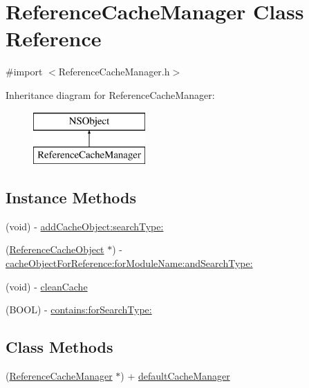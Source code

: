 \hypertarget{interface_reference_cache_manager}{\section{Reference\-Cache\-Manager Class Reference}
\label{interface_reference_cache_manager}
}


{\ttfamily \#import $<$Reference\-Cache\-Manager.\-h$>$}

Inheritance diagram for Reference\-Cache\-Manager\-:\begin{figure}[H]
\begin{center}
\leavevmode
\includegraphics[height=2.000000cm]{interface_reference_cache_manager}
\end{center}
\end{figure}
\subsection*{Instance Methods}
\begin{DoxyCompactItemize}
\item 
(void) -\/ \hyperlink{interface_reference_cache_manager_af47eaefadf41368497a163141b9c8ff6}{add\-Cache\-Object\-:search\-Type\-:}
\item 
(\hyperlink{interface_reference_cache_object}{Reference\-Cache\-Object} $\ast$) -\/ \hyperlink{interface_reference_cache_manager_aa813df3855a6783aa971c9d3444ddddc}{cache\-Object\-For\-Reference\-:for\-Module\-Name\-:and\-Search\-Type\-:}
\item 
(void) -\/ \hyperlink{interface_reference_cache_manager_a655828f5e0358af7462394eaa8be2fdd}{clean\-Cache}
\item 
(B\-O\-O\-L) -\/ \hyperlink{interface_reference_cache_manager_afa5ea945a1806464a933e165d4ce7b4f}{contains\-:for\-Search\-Type\-:}
\end{DoxyCompactItemize}
\subsection*{Class Methods}
\begin{DoxyCompactItemize}
\item 
(\hyperlink{interface_reference_cache_manager}{Reference\-Cache\-Manager} $\ast$) + \hyperlink{interface_reference_cache_manager_add4ed372c05247d062db4c19da40e1a4}{default\-Cache\-Manager}
\end{DoxyCompactItemize}
